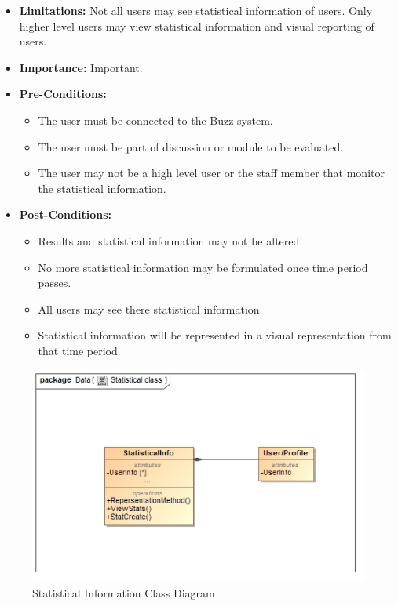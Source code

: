 \documentclass[11pt]{article}
\begin{document}
\begin{enumerate}
\begin{itemize}
\item\textbf{Limitations:} Not all users may see statistical information of users. Only higher level users may view statistical information and visual reporting of users.

 
\item\textbf{Importance:} Important.



\item\textbf{Pre-Conditions: }
	\begin{itemize}
		\item The user must be connected to the Buzz system.
		\item The user must be part of discussion or module to be evaluated.
		\item The user may not be a high level user or the staff member that monitor the statistical information.
	\end{itemize}
 

\item\textbf{Post-Conditions: }
	\begin{itemize}
		\item Results and statistical information may not be altered.
		\item No more statistical information may be formulated once time period passes.
		\item All users may see there statistical information.
		\item Statistical information will be represented in a visual representation from that time period.
	\end{itemize}
\end{itemize}
\graphicspath{ {../Diagrams/Matt/Class/} }
	  \begin{figure}[H]	
    	\includegraphics[scale=0.5]{StatisticalClass.jpg}
    	\caption{Statistical Information Class Diagram}
	\end{figure}


\end{enumerate}
\end{document}
